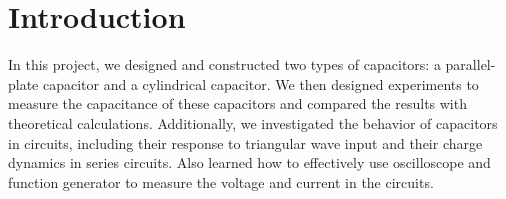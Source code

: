 \chapter{Introduction}
In this project, we designed and constructed two types of capacitors: a parallel-plate capacitor and a cylindrical capacitor. We then designed experiments to measure the capacitance of these capacitors and compared the results with theoretical calculations. Additionally, we investigated the behavior of capacitors in circuits, including their response to triangular wave input and their charge dynamics in series circuits. Also learned how to effectively use oscilloscope and function generator to measure the voltage and current in the circuits.
